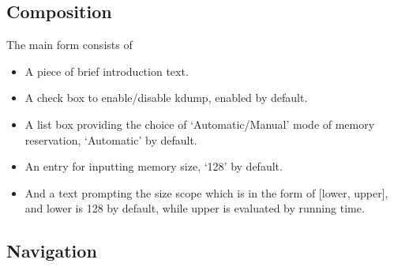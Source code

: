 \documentclass{article}
\begin{document}
\subsection{Composition}
The main form consists of
\begin{itemize}
\item A piece of brief introduction text.
\item A check box to enable/disable kdump, enabled by default.
\item A list box providing the choice of `Automatic/Manual' mode of memory
reservation, `Automatic' by default. 
\item An entry for inputting memory size, `128' by default.
\item And a text prompting the size scope which is in the form of [lower,
upper], and lower is 128 by default, while upper is evaluated by running time. 
\end{itemize}
\begin{figure}[H]        
\end{figure}

\subsection{Navigation}
\end{document}
